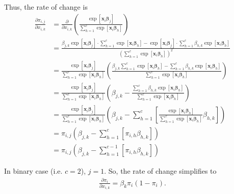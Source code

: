 Thus, the rate of change is
\begin{align*}
\frac{\partial \pi_{i,j}}{\partial x_{i,k}} &= \frac{\partial}{\partial x_{i,k}}\left(\frac{\exp\left[\bm{x}_{i}\bm{\beta}_{j}\right]}{\sum_{h=1}^{c}\exp\left[\bm{x}_{i}\bm{\beta}_{h}\right]}\right)\\
&= \frac{\beta_{j,k}\exp\left[\bm{x}_{i}\bm{\beta}_{j}\right] \cdot \sum_{h=1}^{c}\exp\left[\bm{x}_{i}\bm{\beta}_{h}\right] - \exp\left[\bm{x}_{i}\bm{\beta}_{j}\right] \cdot \sum_{h=1}^{c}\beta_{h,k}\exp\left[\bm{x}_{i}\bm{\beta}_{h}\right]}{\left(\sum_{h=1}^{c}\exp\left[\bm{x}_{i}\bm{\beta}_{h}\right]\right)^2}\\
&= \frac{\exp\left[\bm{x}_{i}\bm{\beta}_{j}\right]}{\sum_{h=1}^{c}\exp\left[\bm{x}_{i}\bm{\beta}_{h}\right]}\left(\frac{\beta_{j,k}\sum_{h=1}^{c}\exp\left[\bm{x}_{i}\bm{\beta}_{h}\right] - \sum_{h=1}^{c}\beta_{h,k}\exp\left[\bm{x}_{i}\bm{\beta}_{h}\right]}{\sum_{h=1}^{c}\exp\left[\bm{x}_{i}\bm{\beta}_{h}\right]}\right)\\
&= \frac{\exp\left[\bm{x}_{i}\bm{\beta}_{j}\right]}{\sum_{h=1}^{c}\exp\left[\bm{x}_{i}\bm{\beta}_{h}\right]}\left(\beta_{j,k} -\frac{\sum_{h=1}^{c}\beta_{h,k}\exp\left[\bm{x}_{i}\bm{\beta}_{h}\right]}{\sum_{h=1}^{c}\exp\left[\bm{x}_{i}\bm{\beta}_{h}\right]}\right)\\
&= \frac{\exp\left[\bm{x}_{i}\bm{\beta}_{j}\right]}{\sum_{h=1}^{c}\exp\left[\bm{x}_{i}\bm{\beta}_{h}\right]}\left(\beta_{j,k} -\sum_{h=1}^{c}\left[\frac{\exp\left[\bm{x}_{i}\bm{\beta}_{h}\right]}{\sum_{h=1}^{c}\exp\left[\bm{x}_{i}\bm{\beta}_{h}\right]}\beta_{h,k}\right]\right)\\
&= \pi_{i,j}\left(\beta_{j,k} -\sum_{h=1}^{c}\left[\pi_{i,h}\beta_{h,k}\right]\right)\\
&= \pi_{i,j}\left(\beta_{j,k} -\sum_{h=1}^{c-1}\left[\pi_{i,h}\beta_{h,k}\right]\right)
\end{align*}

In binary case (i.e. $c = 2$), $j = 1$. So, the rate of change simplifies to 
\begin{align*}
\frac{\partial \pi_{i}}{\partial x_{i,k}} = \beta_{k}\pi_{i}(1-\pi_{i}).
\end{align*}
